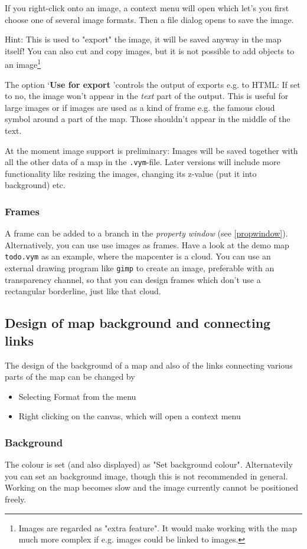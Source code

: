 \documentclass[12pt,a4paper]{article}
\begin{document}
If you right-click onto an image, a context menu will open which let's
you first choose one of several image formats. Then a file dialog opens
to save the image. 

Hint: This is used to "export" the image, it will be
saved anyway in the map itself! You can also cut and
copy images, but it is not possible to add objects to an image\footnote{
	Images are regarded as "extra feature". It would make working with
	the map much more complex if e.g. images could be linked to images.}

The option \lq{\bf Use for export} \rq controls the output of exports
e.g. to HTML: If set to no, the image won't appear in the {\em text}
part of the output. This is useful for large images or if images are
used as a kind of frame e.g. the famous cloud symbol around a part of
the map. Those shouldn't appear in the middle of the text.

At the moment image support is preliminary: Images will be saved
together with all the other data of a map in the {\tt .vym}-file.
Later versions will include more functionality like resizing the images,
changing its z-value (put it into background) etc.

\subsubsection*{Frames}
A frame can be added to a branch in the {\em property window} (see
\ref{propwindow}). 
Alternatively, you can use use images as frames. Have a look at the demo
map {\tt todo.vym} as an example, where the mapcenter is a cloud. You
can use an external drawing program like {\tt gimp} to create an image,
preferable with an transparency channel, so that you can design frames
which don't use a rectangular borderline, just like that cloud.


\subsection{Design of map background and connecting links }
The design of the background of a map and also of the links connecting
various parts of the map can be changed by
\begin{itemize}
	\item Selecting Format from the menu
	\item Right clicking on the canvas, which will open a context menu
\end{itemize}

\subsubsection*{Background }
The colour is set (and also displayed) as "Set background colour".
Alternatevily you can set an background image, though this is not
recommended in general. Working on the map becomes slow and the image
currently cannot be positioned freely.
\end{document}
